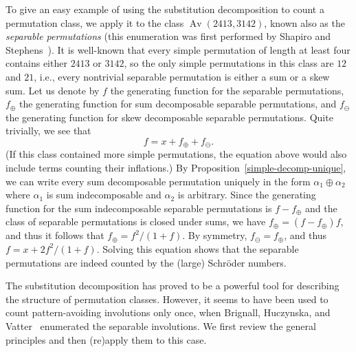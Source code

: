 \documentclass[10pt]{article}
\theoremstyle{plain}
\newcommand{\Av}{\operatorname{Av}}
\begin{document}
To give an easy example of using the substitution decomposition to count a permutation class, we apply it to the class $\Av(2413,3142)$, known also as the \emph{separable permutations} (this enumeration was first performed by Shapiro and Stephens~\cite{shapiro:bootstrap-perco:}). It is well-known that every simple permutation of length at least four contains either $2413$ or $3142$, so the only simple permutations in this class are $12$ and $21$, i.e., every nontrivial separable permutation is either a sum or a skew sum. Let us denote by $f$ the generating function for the separable permutations, $f_\oplus$ the generating function for sum decomposable separable permutations, and $f_\ominus$ the generating function for skew decomposable separable permutations. Quite trivially, we see that
$$
f=x+f_\oplus+f_\ominus.
$$
(If this class contained more simple permutations, the equation above would also include terms counting their inflations.) By Proposition~\ref{simple-decomp-unique}, we can write every sum decomposable permutation uniquely in the form $\alpha_1\oplus\alpha_2$ where $\alpha_1$ is sum indecomposable and $\alpha_2$ is arbitrary. Since the generating function for the sum indecomposable separable permutations is $f-f_\oplus$ and the class of separable permutations is closed under sums, we have $f_\oplus=(f-f_\oplus)f$, and thus it follows that $f_\oplus={f^2}/(1+f)$. By symmetry, $f_\ominus=f_\oplus$, and thus $f=x+2f^2/(1+f)$. Solving this equation shows that the separable permutations are indeed counted by the (large) Schr\"oder numbers.

The substitution decomposition has proved to be a powerful tool for describing the structure of permutation classes. However, it seems to have been used to count pattern-avoiding involutions only once, when Brignall, Huczynska, and Vatter~\cite{brignall:simple-permutat:} enumerated the separable involutions. We first review the general principles and then (re)apply them to this case.
\end{document}
